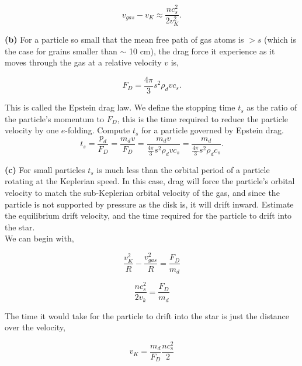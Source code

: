 \documentclass[12pt]{article}
\begin{document}
\begin{equation}
v_{gas} - v_K \approx \frac{nc_s^2}{2v_K^2}.
\end{equation}


\noindent \textbf{(b)} For a particle so small that the mean free path of gas atoms is $> s$ (which is the case for grains smaller than $\sim$ 10 cm), the drag force it experience as it moves through the gas at a relative velocity $v$ is,

\begin{equation}
F_D = \frac{4\pi}{3}s^2\rho_dvc_s.
\end{equation}

\noindent This is called the Epstein drag law. We define the stopping time $t_s$ as the ratio of the particle's momentum to $F_D$, this is the time required to reduce the particle velocity by one $e$-folding. Compute $t_s$ for a particle governed by Epstein drag. \\


\begin{equation}
t_s = \frac{p_d}{F_D} = \frac{m_dv}{F_D} = \frac{m_dv}{\frac{4\pi}{3}s^2\rho_dvc_s} =  \frac{m_d}{\frac{4\pi}{3}s^2\rho_dc_s}.
\end{equation}

\noindent \textbf{(c)} For small particles $t_s$ is much less than the orbital period of a particle rotating at the Keplerian speed. In this case, drag will force the particle's orbital velocity to match the sub-Keplerian orbital velocity of the gas, and since the particle is not supported by pressure as the disk is, it will drift inward. Estimate the equilibrium drift velocity, and the time required for the particle to drift into the star. \\


\noindent We can begin with,

\begin{equation}
\frac{v_K^2}{R} - \frac{v_{gas}^2}{R} =  \frac{F_D}{m_d}
\end{equation}

\begin{equation}
\frac{nc_s^2}{2v_k}=  \frac{F_D}{m_d}
\end{equation}

\noindent The time it would take for the particle to drift into the star is just the distance over the velocity,

\begin{equation}
v_K = \frac{m_d}{F_D}\frac{nc_s^2}{2}
\end{equation}
\end{document}
